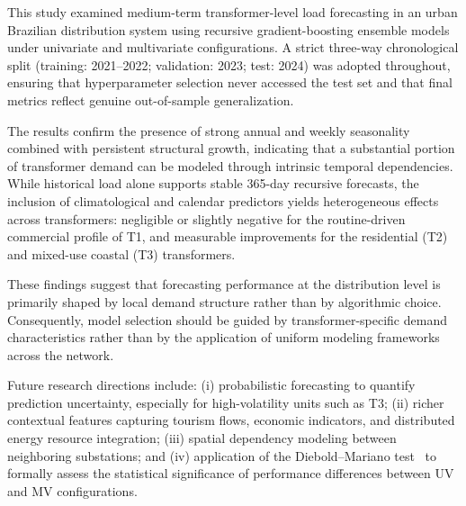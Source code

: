 This study examined medium-term transformer-level load forecasting in an urban Brazilian distribution system using recursive gradient-boosting ensemble models under univariate and multivariate configurations. A strict three-way chronological split (training: 2021--2022; validation: 2023; test: 2024) was adopted throughout, ensuring that hyperparameter selection never accessed the test set and that final metrics reflect genuine out-of-sample generalization.

The results confirm the presence of strong annual and weekly seasonality combined with persistent structural growth, indicating that a substantial portion of transformer demand can be modeled through intrinsic temporal dependencies. While historical load alone supports stable 365-day recursive forecasts, the inclusion of climatological and calendar predictors yields heterogeneous effects across transformers: negligible or slightly negative for the routine-driven commercial profile of T1, and measurable improvements for the residential (T2) and mixed-use coastal (T3) transformers.

These findings suggest that forecasting performance at the distribution level is primarily shaped by local demand structure rather than by algorithmic choice. Consequently, model selection should be guided by transformer-specific demand characteristics rather than by the application of uniform modeling frameworks across the network.

Future research directions include: (i) probabilistic forecasting to quantify prediction uncertainty, especially for high-volatility units such as T3; (ii) richer contextual features capturing tourism flows, economic indicators, and distributed energy resource integration; (iii) spatial dependency modeling between neighboring substations; and (iv) application of the Diebold--Mariano test~\cite{DieboldMariano1995} to formally assess the statistical significance of performance differences between UV and MV configurations.




